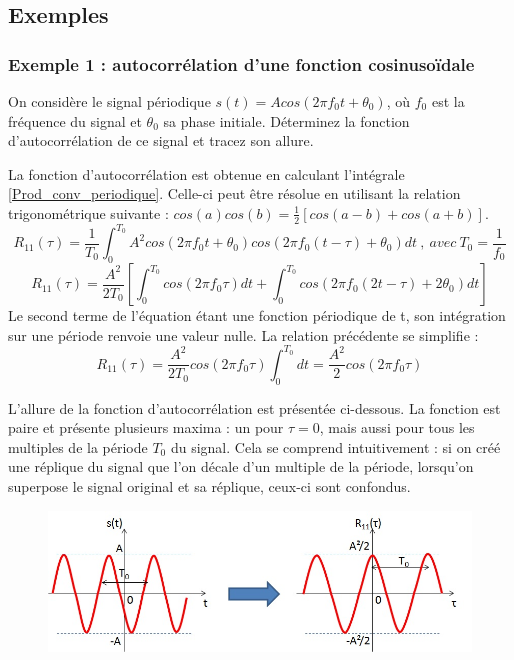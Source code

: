 	\subsection{Exemples}
	
	\subsubsection{Exemple 1 : autocorrélation d'une fonction cosinusoïdale}
	
	On considère le signal périodique $s(t)=Acos(2\pi f_{0}t+\theta_{0})$, où $f_{0}$ est la fréquence du signal et $\theta_{0}$ sa phase initiale. Déterminez la fonction d'autocorrélation de ce signal et tracez son allure.
	
	La fonction d'autocorrélation est obtenue en calculant l'intégrale \ref{Prod_conv_periodique}. Celle-ci peut être résolue en utilisant la relation trigonométrique suivante : $cos(a)cos(b)=\frac{1}{2}[cos(a-b)+cos(a+b)]$.
	\begin{equation*}
	R_{11}(\tau)=\frac{1}{T_{0}}\int_{0}^{T_{0}}A^{2}cos(2\pi f_{0}t+\theta_{0})cos(2\pi f_{0}(t-\tau)+\theta_{0})dt~,~avec~T_{0}=\frac{1}{f_{0}}
	\end{equation*}
	\begin{equation*}
	R_{11}(\tau)=\frac{A^{2}}{2T_{0}}[\int_{0}^{T_{0}}cos(2\pi f_{0}\tau)dt+\int_{0}^{T_{0}}cos(2\pi f_{0}(2t-\tau)+2\theta_{0})dt]
	\end{equation*}
	Le second terme de l'équation étant une fonction périodique de t, son intégration sur une période renvoie une valeur nulle. La relation précédente se simplifie :
	\begin{equation*}
	R_{11}(\tau)=\frac{A^{2}}{2T_{0}}cos(2\pi f_{0}\tau)\int_{0}^{T_{0}}dt=\frac{A^{2}}{2}cos(2\pi f_{0}\tau)
	\end{equation*}
	
	L'allure de la fonction d'autocorrélation est présentée ci-dessous. La fonction est paire et présente plusieurs maxima : un pour $\tau=0$, mais aussi pour tous les multiples de la période $T_{0}$ du signal. Cela se comprend intuitivement : si on créé une réplique du signal que l'on décale d'un multiple de la période, lorsqu'on superpose le signal original et sa réplique, ceux-ci sont confondus. 
	\begin{figure}[h!]
		\centering
		\includegraphics[scale=0.6]{images/autocorr_cosinus.jpg}
	\end{figure}
	
